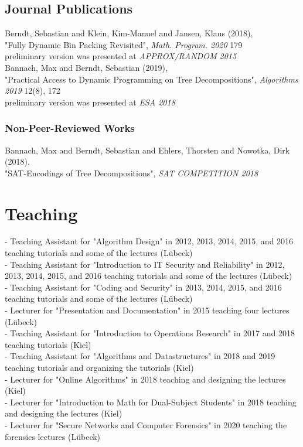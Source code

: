 \documentclass[10pt, a4paper]{article}
\newcommand{\years}[1]{\marginnote{\scriptsize #1}}
\begin{document}
\subsection*{Journal Publications}
\years{2018} Berndt, Sebastian and Klein, Kim-Manuel and Jansen, Klaus (2018),\\
"Fully Dynamic Bin Packing Revisited", \emph{Math. Program. 2020} 179\\
preliminary version was presented at \emph{APPROX/RANDOM 2015}\\
\years{2019} Bannach, Max and Berndt, Sebastian  (2019),\\
"Practical Access to Dynamic Programming on Tree Decompositions", \emph{Algorithms 2019} 12(8), 172\\
preliminary version was presented at \emph{ESA 2018}


\subsubsection*{Non-Peer-Reviewed Works}
\years{2018} Bannach, Max and Berndt, Sebastian and Ehlers, Thorsten and
Nowotka, Dirk (2018),\\
"SAT-Encodings of Tree Decompositions", \emph{SAT COMPETITION 2018}

\newpage
\section*{Teaching}
\label{teaching}
- Teaching Assistant for "Algorithm Design" in 2012, 2013, 2014, 2015, and 2016
teaching tutorials and some of the lectures (Lübeck)\\
- Teaching Assistant for "Introduction to IT Security and Reliability" in 2012,
2013, 2014, 2015, and 2016 teaching tutorials and some of the lectures (Lübeck)\\
- Teaching Assistant for "Coding and Security" in 2013, 2014, 2015, and 2016 teaching tutorials and some of the lectures (Lübeck)\\
- Lecturer for  "Presentation and Documentation" in 2015 teaching four lectures (Lübeck)\\
- Teaching Assistant for "Introduction to Operations Research" in 2017 and 2018
teaching tutorials (Kiel)\\
- Teaching Assistant for "Algorithms and Datastructures" in 2018 and 2019
teaching tutorials and organizing the tutorials (Kiel)\\
- Lecturer for "Online Algorithms" in 2018 teaching and designing the lectures
(Kiel)\\
- Lecturer for "Introduction to Math for Dual-Subject Students" in 2018 teaching
and designing the lectures (Kiel)\\
- Lecturer for "Secure Networks and Computer Forensics" in 2020 teaching the
forensics lectures (Lübeck)
\end{document}
